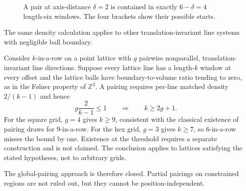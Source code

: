 \begin{figure}[tbp]
  \centering
  \caption{A pair at axis-distance $\delta=2$ is contained in exactly
  $6-\delta=4$ length-six windows.  The four brackets show their possible
  starts.}
  \label{fig:pairing-density}
\end{figure}

The same density calculation applies to other translation-invariant line
systems with negligible ball boundary.

\begin{corollary}
\label{cor:T8.1}
Consider $k$-in-a-row on a point lattice with $g$ pairwise nonparallel,
translation-invariant line directions.  Suppose every lattice line has a
length-$k$ window at every offset and the lattice balls have
boundary-to-volume ratio tending to zero, as in the F{\o}lner property of
$\mathbb Z^2$.  A pairing requires per-line matched density $2/(k-1)$ and
hence
\[
  g\frac{2}{k-1}\le1
  \qquad\Longrightarrow\qquad k\ge2g+1.
\]
For the square grid, $g=4$ gives $k\ge9$, consistent with the classical
existence of pairing draws for $9$-in-a-row.  For the hex grid, $g=3$ gives
$k\ge7$, so $6$-in-a-row misses the bound by one.  Existence at the threshold
requires a separate construction and is not claimed.  The conclusion applies
to lattices satisfying the stated hypotheses, not to arbitrary grids.
\end{corollary}

The global-pairing approach is therefore closed.  Partial pairings on
constrained regions are not ruled out, but they cannot be position-independent.
